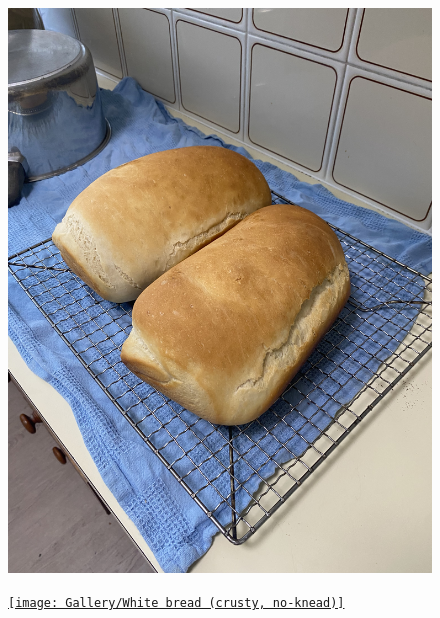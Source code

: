 \documentclass[]{article}
\begin{document}
\newpage\begin{figure}[H]
\begin{center}\hyperref[rec:White Bread]{\includegraphics[keepaspectratio,width=\textheight,height=\textwidth,angle=-90]{Gallery/White Bread}}\caption*{}\label{fig:White Bread}\end{center}
\end{figure}
\newpage\begin{figure}[H]
\begin{center}\hyperref[rec:White bread (crusty, no-knead)]{\texttt{[image: Gallery/White bread (crusty, no-knead)]}}\caption*{}\label{fig:White bread (crusty, no-knead)}\end{center}
\end{figure}
\end{document}
